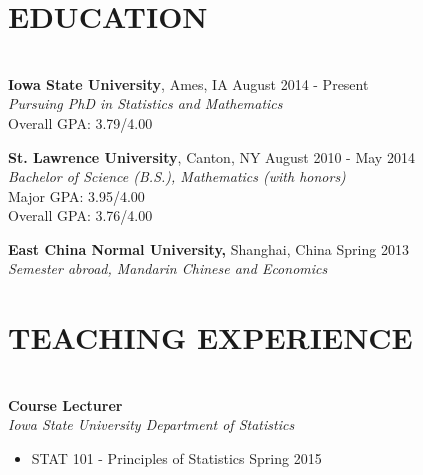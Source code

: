 \documentclass{res} %
\begin{document}
\begin{resume}


\section{EDUCATION}

\hrulefill \\ %
{\bf Iowa State University}, Ames, IA \hfill August 2014 - Present \\
{\sl Pursuing PhD in Statistics and Mathematics} \\
Overall GPA: 3.79/4.00

{\bf St. Lawrence University}, Canton, NY \hfill August 2010 - May 2014 \\
{\sl Bachelor of Science (B.S.), Mathematics (with honors)} \\
Major GPA: 3.95/4.00 \\
Overall GPA: 3.76/4.00 

{\bf East China Normal University,} Shanghai, China \hfill Spring 2013 \\
{\sl Semester abroad, Mandarin Chinese and Economics} 





\section{TEACHING EXPERIENCE}

\hrulefill \\
{\bf Course Lecturer} \\
{\sl Iowa State University Department of Statistics}
\begin{itemize} \itemsep -2pt
\item STAT 101 - Principles of Statistics \hfill Spring 2015
\end{itemize}


\end{resume}
\end{document}

